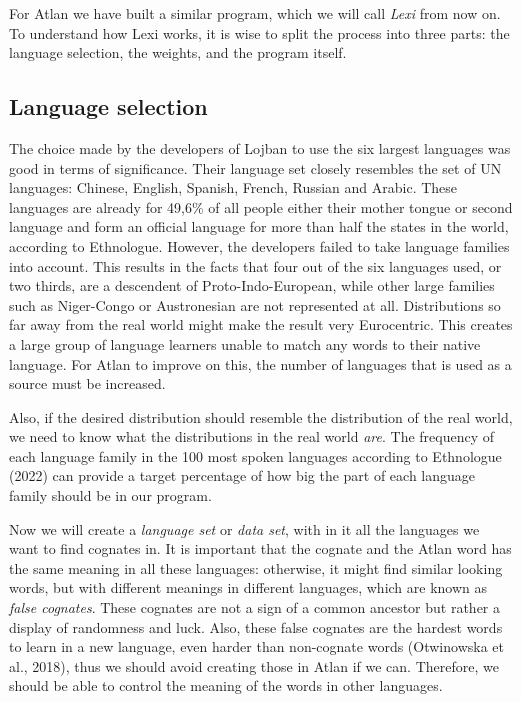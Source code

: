 For Atlan we have built a similar program, which we will call \textit{Lexi} from now on. To understand how Lexi works, it is wise to split the process into three parts: the language selection, the weights, and the program itself.  

\subsection{Language selection }

The choice made by the developers of Lojban to use the six largest languages was good in terms of significance. Their language set closely resembles the set of UN languages: Chinese, English, Spanish, French, Russian and Arabic. These languages are already for 49,6\% of all people either their mother tongue or second language and form an official language for more than half the states in the world, according to Ethnologue. However, the developers failed to take language families into account. This results in the facts that four out of the six languages used, or two thirds, are a descendent of Proto-Indo-European, while other large families such as Niger-Congo or Austronesian are not represented at all. Distributions so far away from the real world might make the result very Eurocentric. This creates a large group of language learners unable to match any words to their native language. For Atlan to improve on this, the number of languages that is used as a source must be increased. 

Also, if the desired distribution should resemble the distribution of the real world, we need to know what the distributions in the real world \textit{are}. The frequency of each language family in the 100 most spoken languages according to Ethnologue (2022) can provide a target percentage of how big the part of each language family should be in our program.  

Now we will create a \textit{language set} or \textit{data set}, with in it all the languages we want to find cognates in. It is important that the cognate and the Atlan word has the same meaning in all these languages: otherwise, it might find similar looking words, but with different meanings in different languages, which are known as \textit{false cognates}. These cognates are not a sign of a common ancestor but rather a display of randomness and luck. Also, these false cognates are the hardest words to learn in a new language, even harder than non-cognate words (Otwinowska et al., 2018), thus we should avoid creating those in Atlan if we can. Therefore, we should be able to control the meaning of the words in other languages. 

